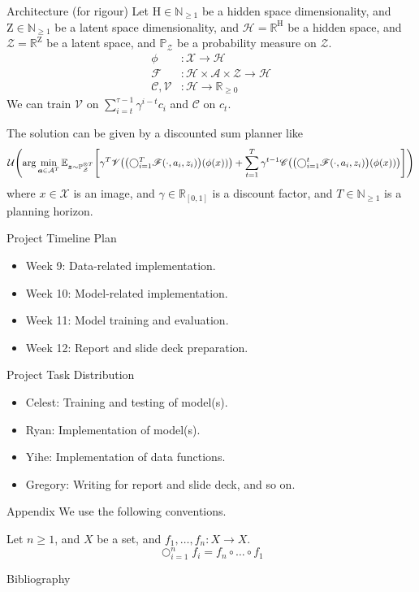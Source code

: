 \documentclass[aspectratio=169,notheorems,8pt]{beamer}
\newcommand{\E}{\mathbb{E}}
\newcommand{\N}{\mathbb{N}}
\newcommand{\R}{\mathbb{R}}
\begin{document}
\begin{frame}{Architecture (for rigour)}
Let $\mathrm{H}\in\N_{\geq 1}$ be a hidden space dimensionality,
and $\mathrm{Z}\in\N_{\geq 1}$ be a latent space dimensionality,
and $\mathcal{H}=\R^{\mathrm{H}}$ be a hidden space,
and $\mathcal{Z}=\R^{\mathrm{Z}}$ be a latent space,
and $\mathbb{P}_{\mathcal{Z}}$ be a probability measure on $\mathcal{Z}$.
\begin{align*}
	\phi
	&:
	\mathcal{X}\to\mathcal{H}
	\tag{encoder}
	\\
	\mathscr{F}
	&:
	\mathcal{H}\times\mathcal{A}\times\mathcal{Z}
	\to
	\mathcal{H}
	\tag{world model}
	\\
	\mathscr{C},\mathscr{V}
	&:
	\mathcal{H}\to\R_{\geq 0}
	\tag{energy}
\end{align*}
We can train $\mathscr{V}$ on $\sum_{i=t}^{\tau-1}\gamma^{i-t}c_{i}$ and $\mathscr{C}$ on $c_{t}$.

The solution can be given by a discounted sum planner like
\begin{align*}
	\mathcal{U}\mleft(
		\arg\min_{\bm{a}\in\mathcal{A}^{T}}
		\E_{\bm{z}\sim\mathbb{P}_{\mathcal{Z}}^{\otimes T}}\mleft[
			\gamma^{T}
			\mathscr{V}\mleft(
				\mleft(
					\bigcirc_{i=1}^{T}
					\mathscr{F}\mleft(\cdot,a_{i},z_{i}\mright)
				\mright)\mleft(
					\phi(x)
				\mright)
			\mright)
			+
			\sum_{t=1}^{T}
			\gamma^{t-1}
			\mathscr{C}\mleft(
				\mleft(
					\bigcirc_{i=1}^{t}
					\mathscr{F}\mleft(\cdot,a_{i},z_{i}\mright)
				\mright)\mleft(
					\phi(x)
				\mright)
			\mright)
		\mright]
	\mright)
\end{align*}
where $x\in\mathcal{X}$ is an image,
and $\gamma\in\R_{[0,1]}$ is a discount factor,
and $T\in\N_{\geq 1}$ is a planning horizon.
\end{frame}

\begin{frame}{Project Timeline Plan}
	\begin{itemize}
		\item Week 9: Data-related implementation.
		\item Week 10: Model-related implementation.
		\item Week 11: Model training and evaluation.
		\item Week 12: Report and slide deck preparation.
	\end{itemize}
\end{frame}

\begin{frame}{Project Task Distribution}
	\begin{itemize}
		\item Celest: Training and testing of model(s).
		\item Ryan: Implementation of model(s).
		\item Yihe: Implementation of data functions.
		\item Gregory: Writing for report and slide deck, and so on.
	\end{itemize}
\end{frame}

\begin{frame}{Appendix}
We use the following conventions.

Let $n\geq 1$, and $X$ be a set, and $f_{1},\dots,f_{n}:X\to X$.
$$
	\bigcirc_{i=1}^{n}f_{i}
	=
	f_{n}\circ\dots\circ f_{1}
$$
\end{frame}

\begin{frame}{Bibliography}


\end{frame}
\end{document}
